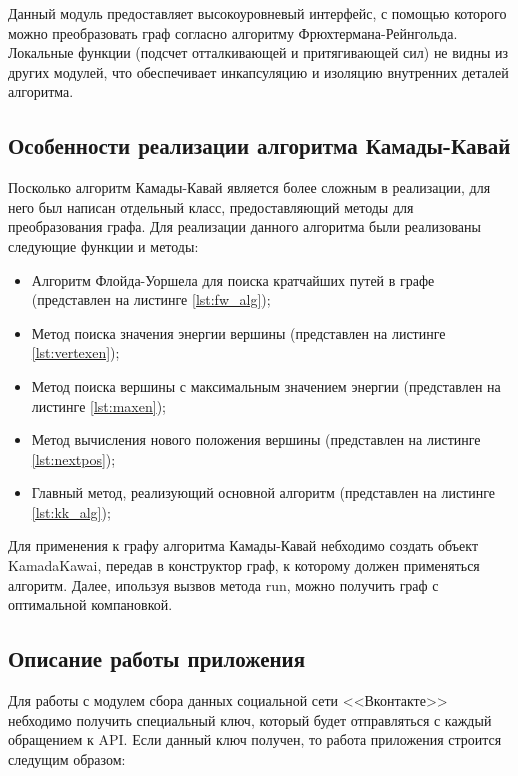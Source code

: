 \documentclass[14pt, russian]{scrartcl}
\begin{document}
Данный модуль предоставляет высокоуровневый интерфейс, с помощью которого можно преобразовать граф согласно алгоритму Фрюхтермана-Рейнгольда. Локальные функции (подсчет отталкивающей и притягивающей сил) не видны из других модулей, что обеспечивает инкапсуляцию и изоляцию внутренних деталей алгоритма.



\subsection{Особенности реализации алгоритма Камады-Кавай}

Посколько алгоритм Камады-Кавай является более сложным в реализации, для него был написан отдельный класс, предоставляющий методы для преобразования графа. Для реализации данного алгоритма были реализованы следующие функции и методы:

\begin{itemize}
	\item Алгоритм Флойда-Уоршела для поиска кратчайших путей в графе (представлен на листинге \ref{lst:fw_alg});
	\item Метод поиска значения энергии вершины (представлен на листинге \ref{lst:vertexen});
	\item Метод поиска вершины с максимальным значением энергии (представлен на листинге \ref{lst:maxen});
	\item Метод вычисления нового положения вершины (представлен на листинге \ref{lst:nextpos});
	\item Главный метод, реализующий основной алгоритм (представлен на листинге \ref{lst:kk_alg});
\end{itemize}

Для применения к графу алгоритма Камады-Кавай небходимо создать объект KamadaKawai, передав в конструктор граф, к которому должен применяться алгоритм. Далее,
ипользуя вызвов метода run, можно получить граф с оптимальной компановкой.



\subsection{Описание работы приложения}

Для работы с модулем сбора данных социальной сети <<Вконтакте>> небходимо получить специальный ключ, который будет отправляться с каждый обращением к API. Если данный ключ получен, то работа приложения строится следущим образом:
\end{document}
